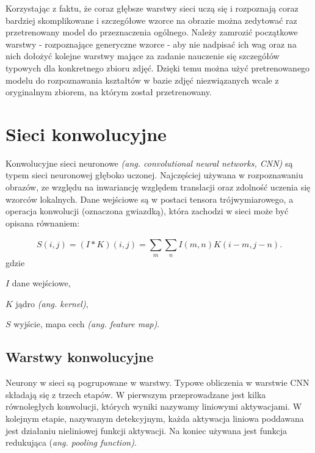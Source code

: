Korzystając z faktu, że coraz głębsze warstwy sieci uczą się i rozpoznają coraz bardziej skomplikowane i szczegółowe wzorce na obrazie można zedytować raz przetrenowany model do przeznaczenia ogólnego. Należy zamrozić początkowe warstwy - rozpoznające generyczne wzorce - aby nie nadpisać ich wag oraz na nich dołożyć kolejne warstwy mające za zadanie nauczenie się szczegółów typowych dla konkretnego zbioru zdjęć. Dzięki temu można użyć pretrenowanego modelu do rozpoznawania kształtów w bazie zdjęć niezwiązanych wcale z oryginalnym zbiorem, na którym został przetrenowany. 


\section{Sieci konwolucyjne} \label{cnn}
Konwolucyjne sieci neuronowe \textit{(ang. convolutional neural networks, CNN)} są typem sieci neuronowej głęboko uczonej. Najczęściej używana w rozpoznawaniu obrazów, ze względu na inwariancję względem translacji oraz zdolność uczenia się wzorców lokalnych. \cite{deep_learning_python} Dane wejściowe są w postaci tensora trójwymiarowego, a operacja konwolucji (oznaczona gwiazdką), która zachodzi w sieci może być opisana równaniem: \cite{deep_learning}

\begin{equation}
S(i,j) = (I * K)(i,j) = \sum_{m}^{}\sum_{n}^{} I(m,n)K(i-m,j-n).
\end{equation}
gdzie
\begin{eqwhere}[2cm]
	\item[$I$] dane wejściowe,
	\item[$K$] jądro \textit{(ang. kernel)},
	\item[$S$] wyjście, mapa cech \textit{(ang. feature map)}.
\end{eqwhere}

\subsection{Warstwy konwolucyjne}
Neurony w sieci są pogrupowane w warstwy. Typowe obliczenia w warstwie CNN składają się z trzech etapów. W pierwszym przeprowadzane jest kilka równoległych konwolucji, których wyniki nazywamy liniowymi aktywacjami. W kolejnym etapie, nazywanym detekcyjnym, każda aktywacja liniowa poddawana jest działaniu nieliniowej funkcji aktywacji. Na koniec używana jest funkcja redukująca (\textit{ang. pooling function)}. \cite{deep_learning}

